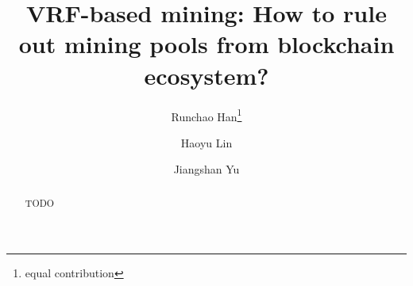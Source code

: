 \documentclass[runningheads]{llncs}
\makeatletter
\newcommand{\printfnsymbol}[1]{%
  \textsuperscript{\@fnsymbol{#1}}%
}
\makeatother
\begin{document}
\title{VRF-based mining: How to rule out mining pools from blockchain ecosystem?}

\author{
    Runchao Han\thanks{equal contribution}
    \and Haoyu Lin\printfnsymbol{1}
    \and Jiangshan Yu
}


\maketitle

\begin{abstract}
    TODO
\end{abstract}













\appendix

\end{document}
